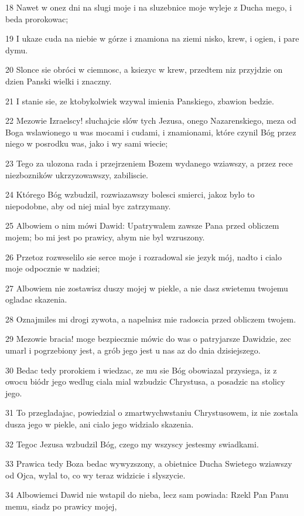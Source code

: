 \par 18 Nawet w onez dni na slugi moje i na sluzebnice moje wyleje z Ducha mego, i beda prorokowac;
\par 19 I ukaze cuda na niebie w górze i znamiona na ziemi nisko, krew, i ogien, i pare dymu.
\par 20 Slonce sie obróci w ciemnosc, a ksiezyc w krew, przedtem niz przyjdzie on dzien Panski wielki i znaczny.
\par 21 I stanie sie, ze ktobykolwiek wzywal imienia Panskiego, zbawion bedzie.
\par 22 Mezowie Izraelscy! sluchajcie slów tych Jezusa, onego Nazarenskiego, meza od Boga wslawionego u was mocami i cudami, i znamionami, które czynil Bóg przez niego w posrodku was, jako i wy sami wiecie;
\par 23 Tego za ulozona rada i przejrzeniem Bozem wydanego wziawszy, a przez rece niezbozników ukrzyzowawszy, zabiliscie.
\par 24 Którego Bóg wzbudzil, rozwiazawszy bolesci smierci, jakoz bylo to niepodobne, aby od niej mial byc zatrzymany.
\par 25 Albowiem o nim mówi Dawid: Upatrywalem zawsze Pana przed obliczem mojem; bo mi jest po prawicy, abym nie byl wzruszony.
\par 26 Przetoz rozweselilo sie serce moje i rozradowal sie jezyk mój, nadto i cialo moje odpocznie w nadziei;
\par 27 Albowiem nie zostawisz duszy mojej w piekle, a nie dasz swietemu twojemu ogladac skazenia.
\par 28 Oznajmiles mi drogi zywota, a napelnisz mie radoscia przed obliczem twojem.
\par 29 Mezowie bracia! moge bezpiecznie mówic do was o patryjarsze Dawidzie, zec umarl i pogrzebiony jest, a grób jego jest u nas az do dnia dzisiejszego.
\par 30 Bedac tedy prorokiem i wiedzac, ze mu sie Bóg obowiazal przysiega, iz z owocu biódr jego wedlug ciala mial wzbudzic Chrystusa, a posadzic na stolicy jego.
\par 31 To przegladajac, powiedzial o zmartwychwstaniu Chrystusowem, iz nie zostala dusza jego w piekle, ani cialo jego widzialo skazenia.
\par 32 Tegoc Jezusa wzbudzil Bóg, czego my wszyscy jestesmy swiadkami.
\par 33 Prawica tedy Boza bedac wywyzszony, a obietnice Ducha Swietego wziawszy od Ojca, wylal to, co wy teraz widzicie i slyszycie.
\par 34 Albowiemci Dawid nie wstapil do nieba, lecz sam powiada: Rzekl Pan Panu memu, siadz po prawicy mojej,
